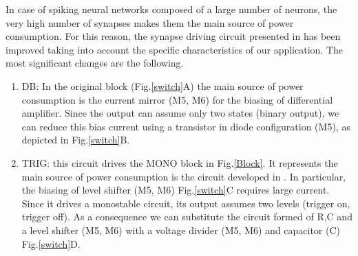 \documentclass[review]{elsarticle}
\begin{document}
 

In case of spiking neural networks composed of a large number of neurons, the very high number of synapses makes them the main source of power consumption.
For this reason, the synapse driving circuit presented in \cite{prime2016} has been improved taking into account the specific characteristics of our application. The most significant changes are the following.


\begin{enumerate}
\item DB: In the original block (Fig.\ref{switch}A) the main source of power consumption is the current mirror (M5, M6) for the biasing of differential amplifier. Since the output can assume only two states (binary output),  we can reduce this bias current using a transistor in diode configuration (M5), as depicted in Fig.\ref{switch}B. 


\item TRIG: this circuit drives the MONO block in Fig.\ref{Block}. It represents the main source of power consumption is the circuit developed in \cite{prime2016}. In particular,  the biasing of level shifter (M5, M6) Fig.\ref{switch}C requires large current. Since it drives a monostable circuit, its output assumes two levels (trigger on, trigger off). As a consequence we can substitute the circuit formed of R,C and a level shifter (M5, M6) with a voltage divider (M5, M6) and capacitor (C) Fig.\ref{switch}D. 



\end{enumerate}
\end{document}
